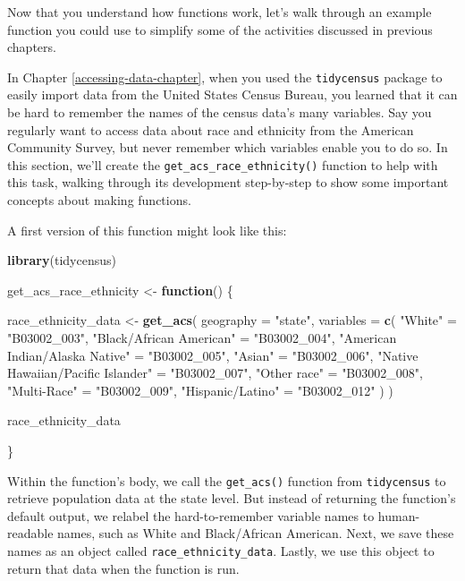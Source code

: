 \documentclass[
]{book}
\newenvironment{Shaded}{\begin{snugshade}}{\end{snugshade}}
\newcommand{\AttributeTok}[1]{\textcolor[rgb]{0.13,0.29,0.53}{#1}}
\newcommand{\ControlFlowTok}[1]{\textcolor[rgb]{0.13,0.29,0.53}{\textbf{#1}}}
\newcommand{\FunctionTok}[1]{\textcolor[rgb]{0.13,0.29,0.53}{\textbf{#1}}}
\newcommand{\NormalTok}[1]{#1}
\newcommand{\OtherTok}[1]{\textcolor[rgb]{0.56,0.35,0.01}{#1}}
\newcommand{\StringTok}[1]{\textcolor[rgb]{0.31,0.60,0.02}{#1}}
\begin{document}
Now that you understand how functions work, let's walk through an example function you could use to simplify some of the activities discussed in previous chapters.

In Chapter \ref{accessing-data-chapter}, when you used the \texttt{tidycensus} package to easily import data from the United States Census Bureau, you learned that it can be hard to remember the names of the census data's many variables. Say you regularly want to access data about race and ethnicity from the American Community Survey, but never remember which variables enable you to do so. In this section, we'll create the \texttt{get\_acs\_race\_ethnicity()} function to help with this task, walking through its development step-by-step to show some important concepts about making functions.

A first version of this function might look like this:

\begin{Shaded}
\begin{Highlighting}[]
\FunctionTok{library}\NormalTok{(tidycensus)}

\NormalTok{get\_acs\_race\_ethnicity }\OtherTok{\textless{}{-}} \ControlFlowTok{function}\NormalTok{() \{}
  
\NormalTok{  race\_ethnicity\_data }\OtherTok{\textless{}{-}}
    \FunctionTok{get\_acs}\NormalTok{(}
      \AttributeTok{geography =} \StringTok{"state"}\NormalTok{,}
      \AttributeTok{variables =} \FunctionTok{c}\NormalTok{(}
        \StringTok{"White"} \OtherTok{=} \StringTok{"B03002\_003"}\NormalTok{,}
        \StringTok{"Black/African American"} \OtherTok{=} \StringTok{"B03002\_004"}\NormalTok{,}
        \StringTok{"American Indian/Alaska Native"} \OtherTok{=} \StringTok{"B03002\_005"}\NormalTok{,}
        \StringTok{"Asian"} \OtherTok{=} \StringTok{"B03002\_006"}\NormalTok{,}
        \StringTok{"Native Hawaiian/Pacific Islander"} \OtherTok{=} \StringTok{"B03002\_007"}\NormalTok{,}
        \StringTok{"Other race"} \OtherTok{=} \StringTok{"B03002\_008"}\NormalTok{,}
        \StringTok{"Multi{-}Race"} \OtherTok{=} \StringTok{"B03002\_009"}\NormalTok{,}
        \StringTok{"Hispanic/Latino"} \OtherTok{=} \StringTok{"B03002\_012"}
\NormalTok{      )}
\NormalTok{    )}
  
\NormalTok{  race\_ethnicity\_data}
  
\NormalTok{\}}
\end{Highlighting}
\end{Shaded}

Within the function's body, we call the \texttt{get\_acs()} function from \texttt{tidycensus} to retrieve population data at the state level. But instead of returning the function's default output, we relabel the hard-to-remember variable names to human-readable names, such as White and Black/African American. Next, we save these names as an object called \texttt{race\_ethnicity\_data}. Lastly, we use this object to return that data when the function is run.
\end{document}
